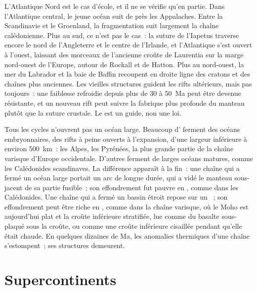 L'Atlantique Nord est le cas d'école, et il ne se vérifie qu'en partie. Dans l'Atlantique central, le
jeune océan suit de près les Appalaches. Entre la Scandinavie et le Groenland, la fragmentation
suit largement la chaîne calédonienne. Plus au sud, ce n'est pas le cas~: la suture de l'Iapetus traverse encore
le nord de l'Angleterre et le centre de l'Irlande, et l'Atlantique s'est ouvert à l'ouest, laissant
des morceaux de l'ancienne croûte de Laurentia sur la marge nord-ouest de l'Europe, autour de Rockall et de Hatton.
Plus au nord-ouest, la mer du Labrador et la baie de Baffin recoupent en droite ligne des cratons et des
chaînes plus anciennes. Les vieilles structures guident les rifts ultérieurs, mais pas toujours~: une faiblesse refroidie depuis plus de
30 à 50~Ma peut être devenue résistante, et un nouveau rift peut suivre la fabrique plus profonde
du manteau plutôt que la suture crustale. Le  est un guide, non une loi.

Tous les cycles n'ouvrent pas un océan large. Beaucoup d' ferment des océans embryonnaires, des rifts à peine
ouverts à l'expansion, d'une largeur inférieure à environ \qty{500}{km}~: les Alpes, les Pyrénées, la plus grande partie de
la chaîne varisque d'Europe occidentale. D'autres ferment de larges océans matures, comme les
Calédonides scandinaves. La différence apparaît à la fin~: une chaîne qui a fermé un océan large portait un
arc de longue durée, qui a vidé le manteau sous-jacent de sa partie fusible~; son effondrement fut pauvre en
, comme dans les Calédonides. Une chaîne qui a fermé un bassin étroit repose sur un ~; son
effondrement peut être riche en , comme dans la chaîne varisque, où le Moho est aujourd'hui plat et la
croûte inférieure stratifiée, lue comme du basalte sous-plaqué sous la croûte, ou comme une croûte inférieure
cisaillée pendant qu'elle était chaude. En quelques dizaines de Ma, les anomalies
thermiques d'une chaîne s'estompent~; ses structures demeurent.

\section{Supercontinents}\label{sec:b2:wilson-cycle:supercontinents}

